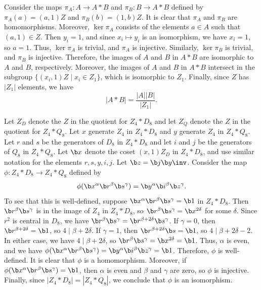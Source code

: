 \begin{solalph}
    \item Consider the maps $\pi_A : A \to A * B$ and $\pi_B : B \to A * B$ defined by $\pi_A(a) = (a, 1)Z$ and $\pi_B(b) = (1, b)Z$. It is clear that $\pi_A$ and $\pi_B$ are homomorphisms. Moreover, $\ker\pi_A$ consists of the elements $a \in A$ such that $(a, 1) \in Z$. Then $y_i = 1$, and since $x_i \mapsto y_i$ is an isomorphism, we have $x_i = 1$, so $a = 1$. Thus, $\ker\pi_A$ is trivial, and $\pi_A$ is injective. Similarly, $\ker\pi_B$ is trivial, and $\pi_B$ is injective. Therefore, the images of $A$ and $B$ in $A * B$ are isomorphic to $A$ and $B$, respectively. Moreover, the images of $A$ and $B$ in $A * B$ intersect in the subgroup $\{(x_i, 1)Z \mid x_i \in Z_1\}$, which is isomorphic to $Z_1$. Finally, since $Z$ has $|Z_1|$ elements, we have
    \[|A * B| = \frac{|A||B|}{|Z_1|}.\]
    \item Let $Z_D$ denote the $Z$ in the quotient for $Z_4 * D_8$ and let $Z_Q$ denote the $Z$ in the quotient for $Z_4 * Q_8$. Let $x$ generate $Z_4$ in $Z_4 * D_8$ and $y$ generate $Z_4$ in $Z_4 * Q_8$. Let $r$ and $s$ be the generators of $D_8$ in $Z_4 * D_8$ and let $i$ and $j$ be the generators of $Q_8$ in $Z_4 * Q_8$. Let $\b x$ denote the coset $(x, 1)Z_D$ in $Z_4 * D_8$, and use similar notation for the elements $r, s, y, i, j$. Let $\b z = \b j\b y\inv$. Consider the map $\phi : Z_4 * D_8 \to Z_4 * Q_8$ defined by 
    \[\phi(\b x^\alpha\b r^\beta\b s^\gamma) = \b y^\alpha\b i^\beta\b z^\gamma.\]
    To see that this is well-defined, suppose $\b x^\alpha\b r^\beta\b s^\gamma = \b 1$ in $Z_4 * D_8$. Then $\b r^\beta\b s^\gamma$ is in the image of $Z_4$ in $Z_4 * D_8$, so $\b r^\beta\b s^\gamma = \b x^{2\delta}$ for some $\delta$. Since $r^2$ is central in $D_8$, we have $\b r^\beta\b s^\gamma = \b r^{\beta + 2\delta}\b s^\gamma$. If $\gamma = 0$, then $\b r^{\beta + 2\delta} = \b 1$, so $4 \mid \beta + 2\delta$. If $\gamma = 1$, then $\b r^{\beta + 2\delta}\b s = \b 1$, so $4 \mid \beta + 2\delta - 2$. In either case, we have $4 \mid \beta + 2\delta$, so $\b r^\beta\b s^\gamma = \b x^{2\delta} = \b 1$. Thus, $\alpha$ is even, and we have $\phi(\b x^\alpha\b r^\beta\b s^\gamma) = \b y^\alpha\b i^\beta\b z^\gamma = \b 1$. Therefore, $\phi$ is well-defined. It is clear that $\phi$ is a homomorphism. Moreover, if $\phi(\b x^\alpha\b r^\beta\b s^\gamma) = \b 1$, then $\alpha$ is even and $\beta$ and $\gamma$ are zero, so $\phi$ is injective. Finally, since $|Z_4 * D_8| = |Z_4 * Q_8|$, we conclude that $\phi$ is an isomorphism.
\end{solalph}

